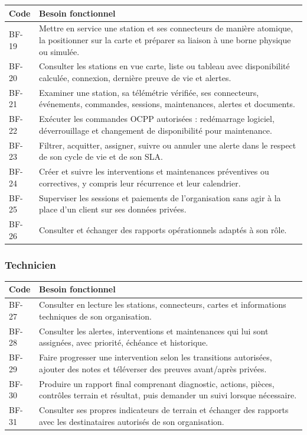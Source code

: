 \begin{longtable}{|C{1.35cm}|p{12.3cm}|}
  \hline
  \textbf{Code} & \textbf{Besoin fonctionnel}\\
  \hline
  BF-19 & Mettre en service une station et ses connecteurs de manière atomique, la
  positionner sur la carte et préparer sa liaison à une borne physique ou simulée.\\\hline
  BF-20 & Consulter les stations en vue carte, liste ou tableau avec disponibilité
  calculée, connexion, dernière preuve de vie et alertes.\\\hline
  BF-21 & Examiner une station, sa télémétrie vérifiée, ses connecteurs, événements,
  commandes, sessions, maintenances, alertes et documents.\\\hline
  BF-22 & Exécuter les commandes OCPP autorisées : redémarrage logiciel,
  déverrouillage et changement de disponibilité pour maintenance.\\\hline
  BF-23 & Filtrer, acquitter, assigner, suivre ou annuler une alerte dans le respect
  de son cycle de vie et de son SLA.\\\hline
  BF-24 & Créer et suivre les interventions et maintenances préventives ou correctives,
  y compris leur récurrence et leur calendrier.\\\hline
  BF-25 & Superviser les sessions et paiements de l'organisation sans agir à la place
  d'un client sur ses données privées.\\\hline
  BF-26 & Consulter et échanger des rapports opérationnels adaptés à son rôle.\\
  \hline
\end{longtable}

\subsubsection{Technicien}

\begin{longtable}{|C{1.35cm}|p{12.3cm}|}
  \hline
  \textbf{Code} & \textbf{Besoin fonctionnel}\\
  \hline
  BF-27 & Consulter en lecture les stations, connecteurs, cartes et informations
  techniques de son organisation.\\\hline
  BF-28 & Consulter les alertes, interventions et maintenances qui lui sont assignées,
  avec priorité, échéance et historique.\\\hline
  BF-29 & Faire progresser une intervention selon les transitions autorisées, ajouter
  des notes et téléverser des preuves avant/après privées.\\\hline
  BF-30 & Produire un rapport final comprenant diagnostic, actions, pièces, contrôles
  terrain et résultat, puis demander un suivi lorsque nécessaire.\\\hline
  BF-31 & Consulter ses propres indicateurs de terrain et échanger des rapports avec
  les destinataires autorisés de son organisation.\\
  \hline
\end{longtable}

